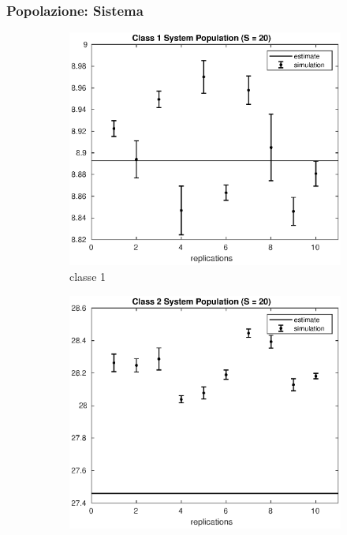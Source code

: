 \subsubsection{Popolazione: Sistema}
%
\begin{figure}[!h]
\centering
%
\begin{subfigure}[t]{0.49\textwidth}
\includegraphics[width=\textwidth]{figures/simul/20_500K_n1}
\caption{classe 1}
\label{20_n1}
\end{subfigure}
%
\begin{subfigure}[t]{0.49\textwidth}
\includegraphics[width=\textwidth]{figures/simul/20_500K_n2}

\end{subfigure}
\end{figure}
